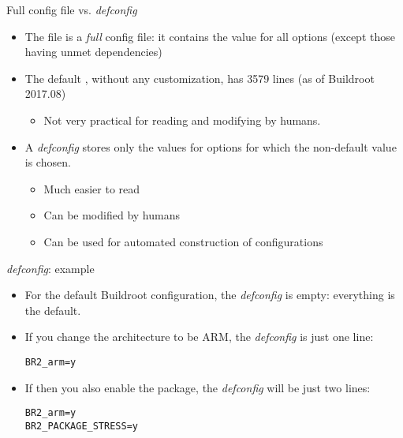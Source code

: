\begin{frame}{Full config file vs. {\em defconfig}}
  \begin{itemize}
  \item The  file is a {\em full} config file: it
    contains the value for all options (except those having unmet
    dependencies)
  \item The default , without any customization, has
    3579 lines (as of Buildroot 2017.08)
    \begin{itemize}
    \item Not very practical for reading and modifying by humans.
    \end{itemize}
  \item A {\em defconfig} stores only the values for options for which
    the non-default value is chosen.
    \begin{itemize}
    \item Much easier to read
    \item Can be modified by humans
    \item Can be used for automated construction of configurations
    \end{itemize}
  \end{itemize}
\end{frame}

\begin{frame}[fragile]{{\em defconfig}: example}
  \begin{itemize}
  \item For the default Buildroot configuration, the {\em defconfig}
    is empty: everything is the default.
  \item If you change the architecture to be ARM, the {\em defconfig}
    is just one line:
{\small
\begin{block}{}
\begin{verbatim}
BR2_arm=y
\end{verbatim}
\end{block}
}
  \item If then you also enable the  package, the {\em
      defconfig} will be just two lines:
{\small
\begin{block}{}
\begin{verbatim}
BR2_arm=y
BR2_PACKAGE_STRESS=y
\end{verbatim}
\end{block}
}
  \end{itemize}
\end{frame}

